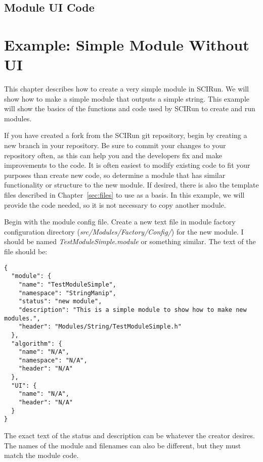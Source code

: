 \documentclass[fleqn,11pt,openany]{book}
\begin{document}
\section{Module UI Code}
\label{sec:ui}

\chapter{Example: Simple Module Without UI}

\begin{introduction}
This chapter describes how to create a very simple module in SCIRun.  
We will show how to make a simple module that outputs a simple string.  
This example will show the basics of the functions and code used by SCIRun to create and run modules.

\end{introduction}

If you have created a fork from the SCIRun git repository, begin by creating a new branch in your repository.  
Be sure to commit your changes to your repository often, as this can help you and the developers fix and make improvements to the code.
It is often easiest to modify existing code to fit your purposes than create new code, so determine a module that has similar functionality or structure to the new module.  
If desired, there is also the template files described in Chapter~\ref{sec:files} to use as a basis.  
In this example, we will provide the code needed, so it is not necessary to copy another module.  


Begin with the module config file.  
Create a new text file in module factory configuration directory (\emph{src/Modules/Factory/Config/}) for the new module.  
I should be named \emph{TestModuleSimple.module} or something similar.  
The text of the file should be:
\begin{verbatim}
{
  "module": {
    "name": "TestModuleSimple",
    "namespace": "StringManip",
    "status": "new module",
    "description": "This is a simple module to show how to make new modules.",
    "header": "Modules/String/TestModuleSimple.h"
  },
  "algorithm": {
    "name": "N/A",
    "namespace": "N/A",
    "header": "N/A"
  },
  "UI": {
    "name": "N/A",
    "header": "N/A"
  }
}
\end{verbatim}
The exact text of the status and description can be whatever the creator desires. 
The names of the module and filenames can also be different, but they must match the module code.  
\end{document}
